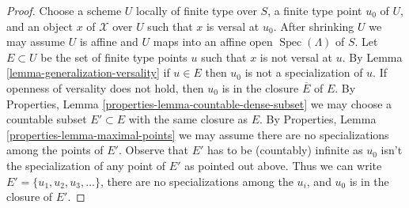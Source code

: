 \documentclass{stacks-project}
\theoremstyle{plain}
\theoremstyle{definition}
\theoremstyle{remark}
\numberwithin{equation}{subsection}
\def\Spec{\mathop{\mathrm{Spec}}}
\begin{document}
\begin{proof}
Choose a scheme $U$ locally of finite type over $S$,
a finite type point $u_0$ of $U$, and an object $x$ of $\mathcal{X}$
over $U$ such that $x$ is versal at $u_0$. After shrinking
$U$ we may assume $U$ is affine and $U$ maps into an affine open
$\Spec(\Lambda)$ of $S$. Let $E \subset U$ be the set of finite type
points $u$ such that $x$ is not versal at $u$. By
Lemma \ref{lemma-generalization-versality}
if $u \in E$ then $u_0$ is not a specialization of $u$.
If openness of versality does not hold, then $u_0$ is in the closure
$\overline{E}$ of $E$. By
Properties, Lemma \ref{properties-lemma-countable-dense-subset}
we may choose a countable subset $E' \subset E$ with the same closure
as $E$. By Properties, Lemma \ref{properties-lemma-maximal-points}
we may assume there are no specializations among the points of $E'$.
Observe that $E'$ has to be (countably) infinite as $u_0$
isn't the specialization of any point of $E'$ as pointed out above.
Thus we can write $E' = \{u_1, u_2, u_3, \ldots\}$, there
are no specializations among the $u_i$, and $u_0$ is in the closure
of $E'$.


\end{proof}
\end{document}
